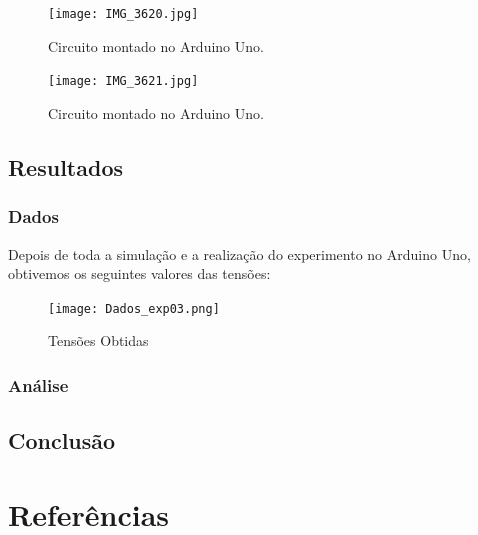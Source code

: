 \documentclass[a4paper,12pt]{article}
\begin{document}
\vspace{1em}
\begin{figure}[H]
    \centering
    \texttt{[image: IMG\_3620.jpg]} %
    \caption{Circuito montado no Arduino Uno.}
    \label{fig:arduino}
\end{figure}

\vspace{1em}

\begin{figure}[H]
    \centering
    \texttt{[image: IMG\_3621.jpg]} %
    \caption{Circuito montado no Arduino Uno.}
    \label{fig:arduino}
\end{figure}

\vspace{1em}

\subsection{Resultados}

\subsubsection{Dados}
\leavevmode

Depois de toda a simulação e a realização do experimento no Arduino Uno, obtivemos os seguintes valores das tensões:

\vspace{1em}

\begin{figure}[H]
    \centering
    \texttt{[image: Dados\_exp03.png]} %
    \caption{Tensões Obtidas}
    \label{fig:arduino}
\end{figure}

\vspace{1em}

\subsubsection{Análise}
\leavevmode

\subsection{Conclusão}
\leavevmode

\section{Referências}
\leavevmode
\end{document}

